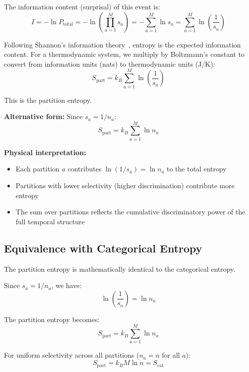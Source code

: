 The information content (surprisal) of this event is:
\begin{equation}
I = -\ln P_{\text{total}} = -\ln\left(\prod_{a=1}^{M} s_a\right) = -\sum_{a=1}^{M} \ln s_a = \sum_{a=1}^{M} \ln\left(\frac{1}{s_a}\right)
\end{equation}

Following Shannon's information theory~\cite{shannon1948}, entropy is the expected information content. For a thermodynamic system, we multiply by Boltzmann's constant to convert from information units (nats) to thermodynamic units (J/K):
\begin{equation}
\boxed{S_{\text{part}} = k_B \sum_{a=1}^{M} \ln\left(\frac{1}{s_a}\right)}
\label{eq:partition_entropy}
\end{equation}

This is the partition entropy.

\textbf{Alternative form:} Since $s_a = 1/n_a$:
\begin{equation}
S_{\text{part}} = k_B \sum_{a=1}^{M} \ln n_a
\end{equation}

\textbf{Physical interpretation:}
\begin{itemize}
\item Each partition $a$ contributes $\ln(1/s_a) = \ln n_a$ to the total entropy
\item Partitions with lower selectivity (higher discrimination) contribute more entropy
\item The sum over partitions reflects the cumulative discriminatory power of the full temporal structure
\end{itemize}

\subsection{Equivalence with Categorical Entropy}

The partition entropy is mathematically identical to the categorical entropy.

Since $s_a = 1/n_a$, we have:
\begin{equation}
\ln\left(\frac{1}{s_a}\right) = \ln n_a
\end{equation}

The partition entropy becomes:
\begin{equation}
S_{\text{part}} = k_B \sum_{a=1}^{M} \ln n_a
\end{equation}

For uniform selectivity across all partitions ($n_a = n$ for all $a$):
\begin{equation}
S_{\text{part}} = k_B M \ln n = S_{\text{cat}}
\end{equation}

